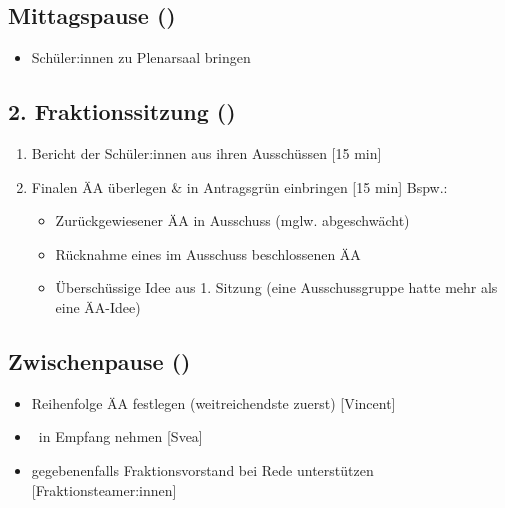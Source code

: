 \documentclass{article}
\newcommand{\KOM}{Svea}
\newcommand{\EP}{Vincent}
\begin{document}
	\subsection{Mittagspause (\timeMittag)}
	\begin{itemize}
		\item Schüler:innen zu Plenarsaal bringen
	\end{itemize}
	
	\subsection{2. Fraktionssitzung (\timeFrakTwo)}
	\begin{enumerate}
		\item Bericht der Schüler:innen aus ihren Ausschüssen [15 min]
		\item Finalen ÄA überlegen \& in Antragsgrün einbringen [15 min] \newline Bspw.:
		\begin{itemize}
			\item Zurückgewiesener ÄA in Ausschuss (mglw. abgeschwächt)
			\item Rücknahme eines im Ausschuss beschlossenen ÄA
			\item Überschüssige Idee aus 1. Sitzung \newline (eine Ausschussgruppe hatte mehr als eine ÄA-Idee)
		\end{itemize}
	\end{enumerate}
	
	\subsection{Zwischenpause (\timePauseTwo)}
	\begin{itemize}
		\item Reihenfolge ÄA festlegen (weitreichendste zuerst) [\EP]
		\item \stadtvertreter\ in Empfang nehmen [\KOM]
		\item gegebenenfalls Fraktionsvorstand bei Rede unterstützen [Fraktionsteamer:innen]
	\end{itemize}
	
\end{document}
